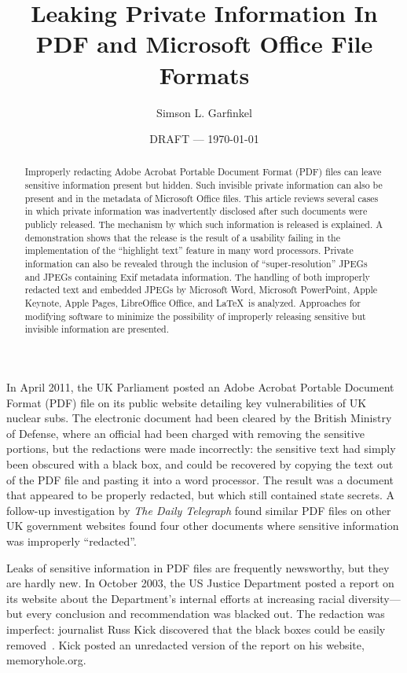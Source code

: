\documentclass{article}
\title{Leaking Private Information In PDF and Microsoft Office File
  Formats}
\author{Simson L. Garfinkel}
\date{DRAFT --- \today}
\begin{document}
\maketitle
\begin{abstract}
Improperly redacting Adobe Acrobat Portable Document Format (PDF)
files can leave sensitive information present but hidden. Such
invisible private information can also be present and in the
metadata of Microsoft Office files. This article reviews several cases
in which private information was inadvertently disclosed after such
documents were publicly released. The mechanism by which such
information is released is explained. A demonstration shows that the
release is the result of a usability failing in the implementation of
the ``highlight text'' feature in many word processors.  Private
information can also be revealed through the inclusion of
``super-resolution'' JPEGs and JPEGs containing Exif metadata
information. The handling of both improperly redacted text and embedded JPEGs by Microsoft Word,
Microsoft PowerPoint, Apple Keynote, Apple Pages, LibreOffice Office,
and \LaTeX\ is analyzed. Approaches for modifying software to minimize the possibility of
improperly releasing sensitive but invisible information are presented.
\end{abstract}
\onehalfspacing

In April 2011, the UK Parliament posted an
Adobe Acrobat Portable Document Format (PDF) file on its public website detailing key vulnerabilities of
UK nuclear subs. The electronic document had been cleared by the
British Ministry of Defense, where an official had been charged with
removing the sensitive portions, but the redactions were made incorrectly: the sensitive text had
simply been obscured with a black box, and could be
recovered by  copying the text out of the PDF file and pasting
it into a word processor. The
result was a document that appeared to  be properly redacted, but
which still contained state secrets.  A follow-up investigation by
\emph{The Daily Telegraph} found similar  PDF files on other UK government websites
found four other documents where sensitive
information was improperly ``redacted''\cite{telegraph-april2011-secrets}.

Leaks of sensitive information  in PDF files are frequently
newsworthy, but they are hardly new. In October 2003, the US Justice
Department posted a report on its website about the Department's
internal efforts at increasing racial diversity---but every conclusion and
recommendation was blacked out. The
redaction was imperfect: journalist
Russ Kick discovered that the black boxes
could be easily removed~\cite{nyt-diversity-critical}. Kick posted an
unredacted version of the report on his website, memoryhole.org. 
\end{document}
